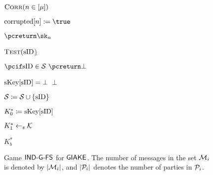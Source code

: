 \begin{figure}[h!]
{{\begin{minipage}[t]{7cm}
				\underline{$\CorruptO(n \in [\mu])$}
				\begin{nicodemus}
					\item $\corrupted[n] := \true$
					\item $\pcreturn \sk_n$\\
				\end{nicodemus}
				
				\underline{$\TestO(\sID$)}
				\begin{nicodemus}
					\item $\pcif \sid\in\testSessions~ \pcreturn \bot$ 
					\item \pcif $\skeys[\sID] = \bot$~\pcreturn $\bot$
					\item $\testSessions \coloneqq \testSessions \cup \{\sid\}$
					\item $K_0^* \coloneqq \skeys[\sID]$
					\item $K_1^* \getsr \mathcal{K}$
					\item \pcreturn $K_b^*$
				\end{nicodemus}
			\end{minipage}
	}}
	\caption{
	Game $\GIAKEsecurityPFSGame$ for $\GIAKE$.
	The number of messages in the set $\GakeIniMesSet[\GakeUId]$ is denoted by $|\GakeIniMesSet[\GakeUId]|$, and 
	$|\peers_\GakeUId|$ denotes the number of parties in $\peers_\GakeUId$.
	\label{fig:game-ind-atk-gake}}
\end{figure}


